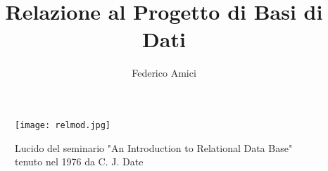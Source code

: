\documentclass[12pt,a4paper,onecolumn,x11names]{article}
\title{Relazione al Progetto di Basi di Dati}
\author{Federico Amici}
\begin{document}
	
\begin{titlepage}
\maketitle

	\vspace{3cm}
	\begin{center}
		\begin{figure}[h]
			\texttt{[image: relmod.jpg]}
			\caption{Lucido del seminario "An Introduction to Relational Data Base" tenuto nel 1976 da C. J. Date}
		\end{figure}
	\end{center}
		
\newpage
\end{titlepage}

\tableofcontents
\listoftables
\listoffigures
\newpage

\end{document}
